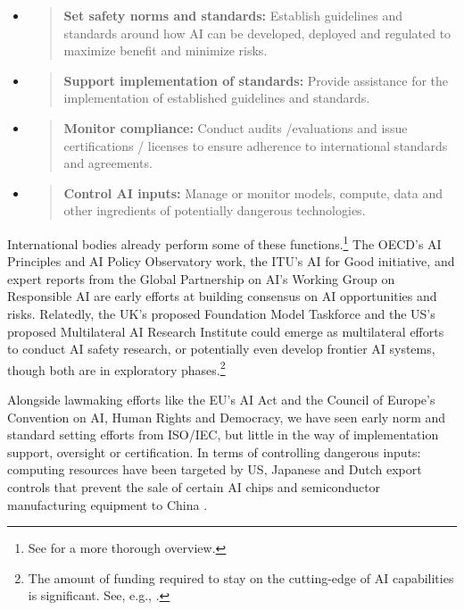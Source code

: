 \documentclass[12pt]{article}
\begin{document}
\begin{itemize}
\item
  \begin{quote}
  \textbf{Set safety norms and standards:} Establish guidelines and
  standards around how AI can be developed, deployed and regulated to
  maximize benefit and minimize risks.
  \end{quote}
\item
  \begin{quote}
  \textbf{Support implementation of standards:} Provide assistance for
  the implementation of established guidelines and standards.
  \end{quote}
\item
  \begin{quote}
  \textbf{Monitor compliance:} Conduct audits /evaluations and issue
  certifications / licenses to ensure adherence to international
  standards and agreements.
  \end{quote}
\item
  \begin{quote}
  \textbf{Control AI inputs:} Manage or monitor models, compute, data
  and other ingredients of potentially dangerous technologies.
  \end{quote}
\end{itemize}

International bodies already perform some of these functions.\footnote{See
  \cite{veale_ai_2023}
  for a more thorough overview.} The OECD's AI Principles and AI Policy
Observatory work, the ITU's AI for Good initiative, and expert reports
from the Global Partnership on AI's Working Group on Responsible AI are
early efforts at building consensus on AI opportunities and risks. Relatedly, the
UK's proposed Foundation Model Taskforce \cite{noauthor_pm_2023}
and the US's proposed Multilateral AI Research Institute could emerge as
multilateral efforts to conduct AI safety research, or
potentially even develop frontier AI systems, though both are in
exploratory phases.\footnote{The amount of funding required to stay on
  the cutting-edge of AI capabilities is significant. See, e.g., \cite{singh_anthropics_2023}.}

Alongside lawmaking efforts like the EU's AI Act and the Council of
Europe's Convention on AI, Human Rights and Democracy, we have seen
early norm and standard setting efforts from ISO/IEC, but little
in the way of implementation support, oversight or certification. In
terms of controlling dangerous inputs: computing resources have been
targeted by US, Japanese and Dutch export controls that prevent the sale
of certain AI chips and semiconductor manufacturing equipment to
China \cite{noauthor_netherlands_2023}.
\end{document}
